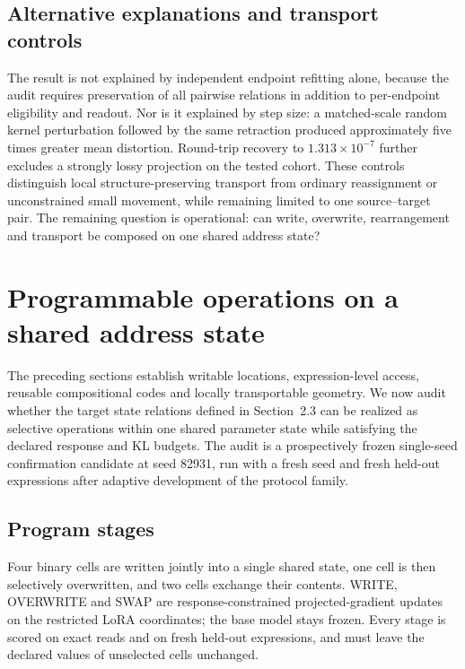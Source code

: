 \documentclass[11pt]{article}
\begin{document}
\subsection{Alternative explanations and transport controls}

The result is not explained by independent endpoint refitting alone, because
the audit requires preservation of all pairwise relations in addition to
per-endpoint eligibility and readout. Nor is it explained by step size: a
matched-scale random kernel perturbation followed by the same retraction
produced approximately five times greater mean distortion. Round-trip recovery
to $1.313\times10^{-7}$ further excludes a strongly lossy projection on the
tested cohort. These controls distinguish local structure-preserving transport
from ordinary reassignment or unconstrained small movement, while remaining
limited to one source--target pair. The remaining question is operational: can
write, overwrite, rearrangement and transport be composed on one shared
address state?

\section{Programmable operations on a shared address state}

The preceding sections establish writable locations, expression-level access, reusable compositional codes and
locally transportable geometry. We now audit whether the target state relations defined in Section~2.3 can be
realized as selective operations within one shared parameter state while satisfying the declared response and
KL budgets. The audit is a prospectively frozen single-seed confirmation candidate at seed 82931, run with a
fresh seed and fresh held-out expressions after adaptive development of the protocol family.

\subsection{Program stages}

Four binary cells are written jointly into a single shared state, one cell is then selectively overwritten, and
two cells exchange their contents. WRITE, OVERWRITE and SWAP are response-constrained projected-gradient
updates on the restricted LoRA coordinates; the base model stays frozen. Every stage is scored on exact reads and on fresh held-out
expressions, and must leave the declared values of unselected cells unchanged.
\end{document}
